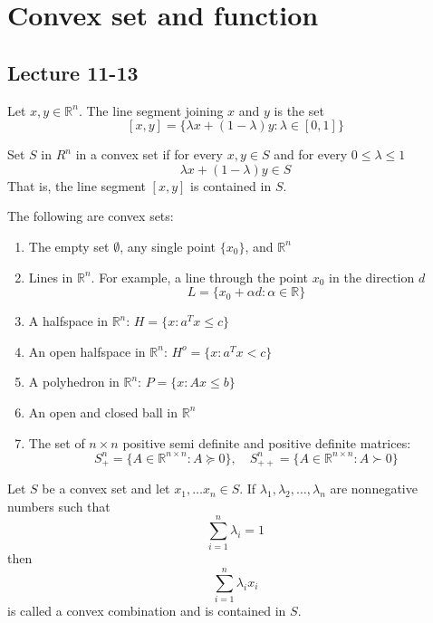 \section{Convex set and function}
\subsection{Lecture 11-13}
\begin{definition}
    Let $x,y \in \mathbb R^n$. The line segment joining $x$ and $y$ is the set
    $$[x,y] = \{\lambda x + (1 - \lambda)y : \lambda \in [0,1]\}$$
\end{definition}

\begin{definition}
    Set $S$ in $R^n$ in a convex set if for every $x, y \in S$ and for every  $0\leq \lambda \leq 1$ $$\lambda x+(1-\lambda)y\in S$$
    That is, the line segment $[x,y]$ is contained in $S$.
\end{definition}
\begin{problem}
    The following are convex sets:
    \begin{enumerate}
        \item The empty set $\emptyset$, any single point $\{x_0\}$, and $\mathbb R^n$
        \item Lines in $\mathbb R^n$. For example, a line through the point $x_0$ in the direction $d$ $$L = \{x_0 + \alpha d: \alpha \in \mathbb R\}$$
        \item A halfspace in $\mathbb R^n$: $H = \{x: a^Tx \leq c\}$
        \item An open halfspace in $\mathbb R^n$: $H^o = \{x: a^Tx < c\}$
        \item A polyhedron in $\mathbb R^n$: $P = \{x: Ax \leq b\}$
        \item An open and closed ball in $\mathbb R^n$
        \item The set of $n \times n$ positive semi definite and positive definite matrices:
        $$S_+^n = \{A \in \mathbb R^{n \times n}: A \succeq 0\}, \quad S_{++}^n = \{A \in \mathbb R^{n \times n}: A \succ 0\}$$
    \end{enumerate}
\end{problem}
\begin{definition}
    Let $S$ be a convex set and let $x_1,\ldots x_n \in S$. If $\lambda_1,\lambda_2,\ldots,\lambda_n$ are nonnegative numbers such that $$\sum_{i=1}^{n} \lambda_i = 1$$ then $$\sum^n_{i=1} \lambda_i x_i$$ is called a convex combination and is contained in $S$.
\end{definition}

